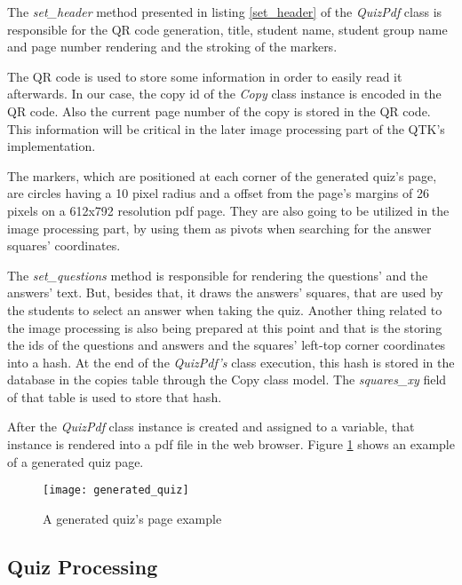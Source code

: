 The \textit{set\_header} method presented in listing \ref{set_header} of the \textit{QuizPdf} class is responsible for the QR code generation, title, student name, student group name and page number rendering and the stroking of the markers. 




The QR code is used to store some information in order to easily read it afterwards. In our case, the copy id of the \textit{Copy} class instance 
is encoded in the QR code. Also the current page number of the copy is stored in the QR code. This information will be critical in the later image processing part of the QTK's implementation. 

The markers, which are positioned at each corner of the generated quiz's page, are circles having a 10 pixel radius and a offset from the page's margins of 26 pixels on a 612x792 resolution pdf page. They are also going to be utilized in the image processing part, by using them as pivots when searching for the answer squares' coordinates.

The \textit{set\_questions} method is responsible for rendering the questions' and the answers' text. But, besides that, it draws the answers' squares, that are used by the students to select an answer when taking the quiz. Another thing related to the image processing is also being prepared at this point and that is the storing the ids of the questions and answers and the squares' left-top corner coordinates into a hash. At the end of the \textit{QuizPdf's} class execution, this hash is stored in the database in the copies table through the Copy class model. The \textit{squares\_xy} field of that table is used to store that hash.

After the \textit{QuizPdf} class instance is created and assigned to a variable, that instance is rendered into a pdf file in the web browser. Figure \ref{generated_quiz_page} shows an example of a generated quiz page. 

\begin{figure}[!ht]
\centering
\texttt{[image: generated\_quiz]}
\caption{A generated quiz's page example}\label{generated_quiz_page}
\end{figure}


\subsection{Quiz Processing}


